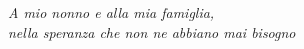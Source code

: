\thispagestyle{empty}
\begin{flushright}
\vspace*{3.0cm}
{\large \textit{A mio nonno e alla mia famiglia,}} \\ 
{\large \textit{nella speranza che non ne abbiano mai bisogno}} \\ 
\end{flushright}
